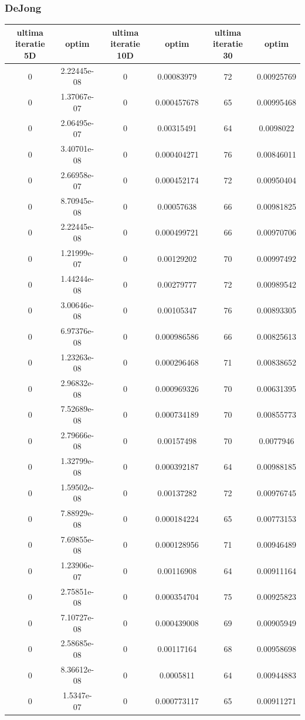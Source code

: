\documentclass{article}
\begin{document}
\subsubsection{DeJong}
\begin{tabular}{cccccc}
\hline
ultima iteratie 5D& optim&ultima iteratie 10D& optim&ultima iteratie 30&optim\\
\hline
0&2.22445e-08&0&0.00083979&72&0.00925769 \\ \hline
0&1.37067e-07&0&0.000457678&65&0.00995468 \\ \hline
0&2.06495e-07&0&0.00315491&64&0.0098022 \\ \hline
0&3.40701e-08&0&0.000404271&76&0.00846011 \\ \hline
0&2.66958e-07&0&0.000452174&72&0.00950404 \\ \hline
0&8.70945e-08&0&0.00057638&66&0.00981825 \\ \hline
0&2.22445e-08&0&0.000499721&66&0.00970706 \\ \hline
0&1.21999e-07&0&0.00129202&70&0.00997492 \\ \hline
0&1.44244e-08&0&0.00279777&72&0.00989542 \\ \hline
0&3.00646e-08&0&0.00105347&76&0.00893305 \\ \hline
0&6.97376e-08&0&0.000986586&66&0.00825613 \\ \hline
0&1.23263e-08&0&0.000296468&71&0.00838652 \\ \hline
0&2.96832e-08&0&0.000969326&70&0.00631395 \\ \hline
0&7.52689e-08&0&0.000734189&70&0.00855773 \\ \hline
0&2.79666e-08&0&0.00157498&70&0.0077946 \\ \hline
0&1.32799e-08&0&0.000392187&64&0.00988185 \\ \hline
0&1.59502e-08&0&0.00137282&72&0.00976745 \\ \hline
0&7.88929e-08&0&0.000184224&65&0.00773153 \\ \hline
0&7.69855e-08&0&0.000128956&71&0.00946489 \\ \hline
0&1.23906e-07&0&0.00116908&64&0.00911164 \\ \hline
0&2.75851e-08&0&0.000354704&75&0.00925823 \\ \hline
0&7.10727e-08&0&0.000439008&69&0.00905949 \\ \hline
0&2.58685e-08&0&0.00117164&68&0.00958698 \\ \hline
0&8.36612e-08&0&0.0005811&64&0.00944883 \\ \hline
0&1.5347e-07&0&0.000773117&65&0.00911271 \\ \hline

\end{tabular}
\end{document}

